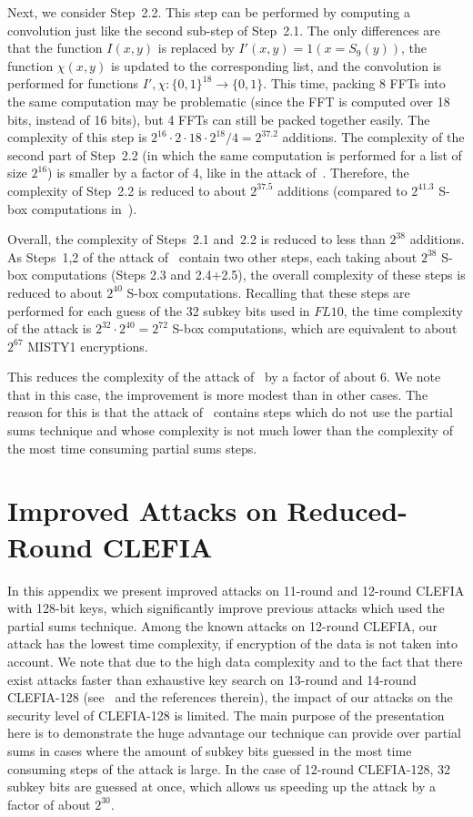 Next, we consider Step~2.2. This step can be performed by computing a convolution just like the second sub-step of Step~2.1. The only differences are that the function $I(x,y)$ is replaced by $I'(x,y)=1(x=S_9(y))$, the function $\chi(x,y)$ is updated to the corresponding list, and the convolution is performed for functions $I',\chi:\{0,1\}^{18} \to \{0,1\}$. This time, packing 8 FFTs into the same computation may be problematic (since the FFT is computed over 18 bits, instead of 16 bits), but 4 FFTs can still be packed together easily. The complexity of this step is $2^{16} \cdot 2 \cdot 18 \cdot 2^{18}/4 = 2^{37.2}$ additions. The complexity of the second part of Step~2.2 (in which the same computation is performed for a list of size $2^{16}$) is smaller by a factor of 4, like in the attack of~\cite{C:BarKel16}. Therefore, the complexity of Step~2.2 is reduced to about $2^{37.5}$ additions (compared to $2^{41.3}$ S-box computations in~\cite{C:BarKel16}). 

Overall, the complexity of Steps~2.1 and~2.2 is reduced to less than $2^{38}$ additions. As Steps~1,2 of the attack of~\cite{C:BarKel16} contain two other steps, each taking about $2^{38}$ S-box computations (Steps 2.3 and 2.4+2.5), the overall complexity of these steps is reduced to about $2^{40}$ S-box computations. Recalling that these steps are performed for each guess of the 32 subkey bits used in $FL10$, the time complexity of the attack is $2^{32} \cdot 2^{40}=2^{72}$ S-box computations, which are equivalent to about $2^{67}$ MISTY1 encryptions. 

This reduces the complexity of the attack of~\cite{C:BarKel16} by a factor of about 6. We note that in this case, the improvement is more modest than in other cases. The reason for this is that the attack of~\cite{C:BarKel16} contains steps which do not use the partial sums technique and whose complexity is not much lower than the complexity of the most time consuming partial sums steps.

\section{Improved Attacks on Reduced-Round CLEFIA}\label{app:CLEFIA}

In this appendix we present improved attacks on 11-round and 12-round CLEFIA with 128-bit keys, which significantly improve previous attacks which used the partial sums technique. Among the known attacks on 12-round CLEFIA, our attack has the lowest time complexity, if encryption of the data is not taken into account. We note that due to the high data complexity and to the fact that there exist attacks faster than exhaustive key search on 13-round and 14-round CLEFIA-128 (see~\cite{JOC:BouraLNS18,FSE:LiJWD15} and the references therein), the impact of our attacks on the security level of CLEFIA-128 is limited. The main purpose of the presentation here is to demonstrate the huge advantage our technique can provide over partial sums in cases where the amount of subkey bits guessed in the most time consuming steps of the attack is large. In the case of 12-round CLEFIA-128, 32 subkey bits are guessed at once, which allows us speeding up the attack by a factor of about $2^{30}$. 

